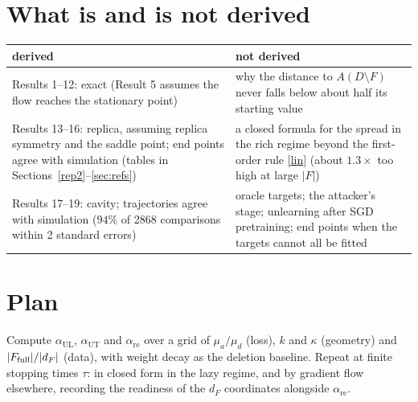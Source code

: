 \documentclass[10pt]{article}
\begin{document}
\section{What is and is not derived}
\begin{center}\small\begin{tabular}{@{}p{7.5cm}p{7.5cm}@{}}\toprule
derived & not derived\\\midrule
Results 1--12: exact (Result 5 assumes the flow reaches the stationary point) & why the distance to $A(D\setminus F)$ never falls below about half its starting value\\
Results 13--16: replica, assuming replica symmetry and the saddle point; end points agree with simulation (tables in Sections~\ref{rep2}--\ref{sec:refs}) & a closed formula for the spread in the rich regime beyond the first-order rule \eqref{lin} (about $1.3\times$ too high at large $|F|$)\\
Results 17--19: cavity; trajectories agree with simulation ($94\%$ of 2868 comparisons within 2 standard errors) & oracle targets; the attacker's stage; unlearning after SGD pretraining; end points when the targets cannot all be fitted\\\bottomrule
\end{tabular}\end{center}
\section{Plan}
Compute $\alpha_{\mathrm{UL}}$, $\alpha_{\mathrm{UT}}$ and $\alpha_{\mathrm{re}}$ over a grid of $\mu_a/\mu_d$ (loss), $k$ and $\kappa$ (geometry) and $|F_{\mathrm{full}}|/|d_F|$ (data), with weight decay as the deletion baseline. Repeat at finite stopping times $\tau$: in closed form in the lazy regime, and by gradient flow elsewhere, recording the readiness of the $d_F$ coordinates alongside $\alpha_{\mathrm{re}}$.
\end{document}
